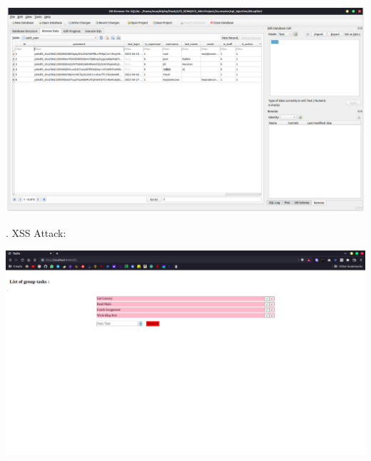 \documentclass[a4paper, 12pt, fleqn]{article}
\begin{document}
\begin{center}
	\vspace{0.1cm}
	\includegraphics[scale=0.25]{sql_db}
\end{center}

. XSS Attack:

\begin{center}
	\vspace{0.1cm}
	\includegraphics[scale=0.25]{xss_before}
\end{center}
\end{document}
